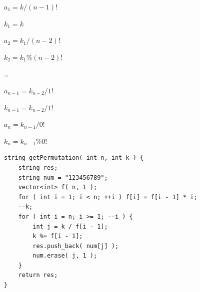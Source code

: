 \documentclass[12pt,a4paper]{article}
\begin{document}
\par
$a_1 = k / (n - 1)!$
\par
$k_1 = k$
\par
$a_2 = k_1 / (n - 2)!$
\par
$k_2 = k_1 \% (n - 2)!$
\par
\dots
\par
$a_{n-1} = k_{n-2} / 1!$
\par
$k_{n-1} = k_{n-2} / 1!$
\par
$a_n = k_{n-1} / 0!$
\par
$k_n = k_{n-1} \% 0!$
\begin{lstlisting}
string getPermutation( int n, int k ) {
	string res;
	string num = "123456789";
	vector<int> f( n, 1 );
	for ( int i = 1; i < n; ++i ) f[i] = f[i - 1] * i;
	--k;
	for ( int i = n; i >= 1; --i ) {
		int j = k / f[i - 1];
		k %= f[i - 1];
		res.push_back( num[j] );
		num.erase( j, 1 );
	}
	return res;
}
\end{lstlisting}
\end{document}
